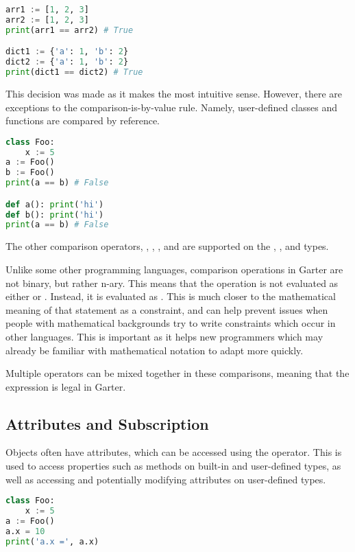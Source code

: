 \begin{lstlisting}[language=Python]
arr1 := [1, 2, 3]
arr2 := [1, 2, 3]
print(arr1 == arr2) # True

dict1 := {'a': 1, 'b': 2}
dict2 := {'a': 1, 'b': 2}
print(dict1 == dict2) # True
\end{lstlisting}

This decision was made as it makes the most intuitive sense. However, there are
exceptions to the comparison-is-by-value rule. Namely, user-defined classes and
functions are compared by reference. 

\begin{lstlisting}[language=Python]
class Foo:
    x := 5
a := Foo()
b := Foo()
print(a == b) # False

def a(): print('hi')
def b(): print('hi')
print(a == b) # False
\end{lstlisting}

The other comparison operators, \code{<}, \code{>}, \code{<=}, and \code{>=}
are supported on the , , and  types.

Unlike some other programming languages, comparison operations in Garter are not
binary, but rather n-ary. This means that the operation  is not
evaluated as either  or . Instead, it is
evaluated as . This is much closer to the mathematical
meaning of that statement as a constraint, and can help prevent issues when
people with mathematical backgrounds try to write constraints which occur in
other languages. This is important as it helps new programmers which may already
be familiar with mathematical notation to adapt more quickly.

Multiple operators can be mixed together in these comparisons, meaning that
the expression  is legal in Garter.

\subsection{Attributes and Subscription}

Objects often have attributes, which can be accessed using the  operator.
This is used to access properties such as methods on built-in and user-defined
types, as well as accessing and potentially modifying attributes on user-defined
types.

\begin{lstlisting}[language=Python]
class Foo:
    x := 5
a := Foo()
a.x = 10
print('a.x =', a.x)
\end{lstlisting}

